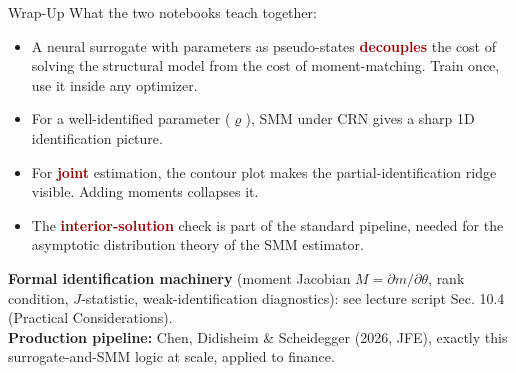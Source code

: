 \documentclass[10pt,aspectratio=169]{beamer}
\newcommand{\emphc}[1]{\textbf{\textcolor{darkred}{#1}}}
\begin{document}
\begin{frame}{Wrap-Up}
\small
What the two notebooks teach together:
\begin{itemize}
\itemsep1pt
  \item A neural surrogate with parameters as pseudo-states \emphc{decouples} the cost of solving the structural model from the cost of moment-matching. Train once, use it inside any optimizer.
  \item For a well-identified parameter ($\varrho$), SMM under CRN gives a sharp 1D identification picture.
  \item For \emphc{joint} estimation, the contour plot makes the partial-identification ridge visible. Adding moments collapses it.
  \item The \emphc{interior-solution} check is part of the standard pipeline, needed for the asymptotic distribution theory of the SMM estimator.
\end{itemize}
\vspace{0.10cm}
{\footnotesize \textbf{Formal identification machinery} (moment Jacobian $M = \partial m/\partial\theta$, rank condition, $J$-statistic, weak-identification diagnostics): see lecture script Sec. 10.4 (Practical Considerations).}
\vspace{0.10cm}\\
\textbf{Production pipeline:} Chen, Didisheim \& Scheidegger (2026, JFE), exactly this surrogate-and-SMM logic at scale, applied to finance.
\end{frame}
\end{document}
